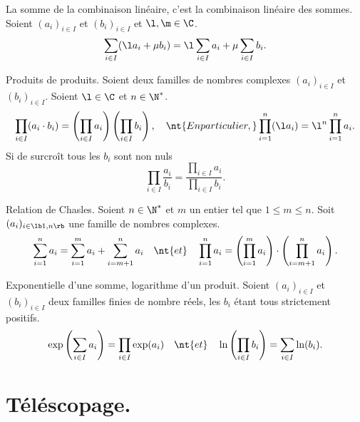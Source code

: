 \documentclass[11pt]{article}
\begin{document}
\begin{corr}{La somme de la combinaison linéaire, c'est la combinaison linéaire des sommes.}{}
    Soient $(a_i)_{i\in I}$ et $(b_i)_{i\in I}$ et $\l,\m\in\C$.
    \begin{equation*}
        \sum_{i\in I}(\l a_i + \mu b_i) = \l\sum_{i\in I}a_i + \mu\sum_{i\in I}b_i.
    \end{equation*}
\end{corr}

\begin{prop}{Produits de produits.}{}
    Soient deux familles de nombres complexes $(a_i)_{i\in I}$ et $(b_i)_{i\in I}$. Soient $\l\in\C$ et $n\in\N^*$.
    \begin{equation*}
        \prod_{i\in I}(a_i\cdot b_i)=\left( \prod_{i\in I}a_i \right)\left( \prod_{i\in I} b_i \right), \quad \nt{En particulier, } \prod_{i=1}^n(\l a_i)=\l^n\prod_{i=1}^na_i.
    \end{equation*}
    Si de surcroît tous les $b_i$ sont non nuls
    \begin{equation*}
        \prod_{i\in I}\frac{a_i}{b_i}=\frac{\prod_{i\in I}a_i}{\prod_{i\in I}b_i}.
    \end{equation*} 
\end{prop}

\begin{prop}{Relation de Chasles.}{}
    Soient $n\in \N^*$ et $m$ un entier tel que $1\leq m \leq n$. Soit $(a_i)_{i\in\lb1,n\rb}$ une famille de nombres complexes.
    \begin{equation*}
        \sum_{i=1}^na_i=\sum_{i=1}^ma_i+\sum_{i=m+1}^na_i \quad \nt{et} \quad \prod_{i=1}^na_i=\left( \prod_{i=1}^ma_i \right) \cdot \left( \prod_{i=m+1}^{n}a_i \right).
    \end{equation*}
\end{prop}

\begin{prop}{Exponentielle d'une somme, logarithme d'un produit.}{}
    Soient $(a_i)_{i\in I}$ et $(b_i)_{i\in I}$ deux familles finies de nombre réels, les $b_i$ étant tous strictement positifs.
    \begin{equation*}
        \exp\left( \sum_{i\in I}a_i \right)=\prod_{i\in I}\exp(a_i) \quad \nt{et} \quad \ln\left( \prod_{i\in I}b_i \right) = \sum_{i\in I}\ln(b_i).
    \end{equation*}
\end{prop}

\section{Téléscopage.}
\end{document}
